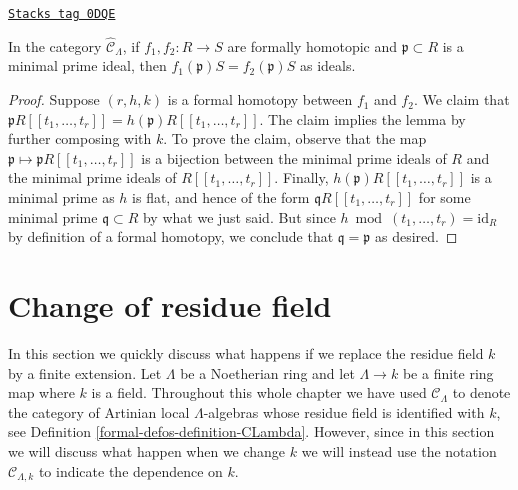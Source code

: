 \begin{lemma}
\label{formal-defos-lemma-homotopic-minimal-prime}
\href{https://stacks.math.columbia.edu/tag/0DQE}{\texttt{Stacks tag 0DQE}}

In the category $\widehat{\mathcal{C}}_\Lambda$, if $f_1, f_2 : R \to S$
are formally homotopic and $\mathfrak p \subset R$ is a minimal
prime ideal, then $f_1(\mathfrak p)S = f_2(\mathfrak p)S$ as ideals.
\end{lemma}

\begin{proof}
Suppose $(r, h, k)$ is a formal homotopy between $f_1$ and $f_2$.
We claim that
$\mathfrak pR[[t_1, \ldots, t_r]] = h(\mathfrak p)R[[t_1, \ldots, t_r]]$.
The claim implies the lemma by further composing with $k$.
To prove the claim, observe that the map
$\mathfrak p \mapsto \mathfrak pR[[t_1, \ldots, t_r]]$
is a bijection between the minimal prime ideals of $R$ and the
minimal prime ideals of $R[[t_1, \ldots, t_r]]$.
Finally, $h(\mathfrak p)R[[t_1, \ldots, t_r]]$ is a minimal
prime as $h$ is flat, and hence of the form
$\mathfrak q R[[t_1, \ldots, t_r]]$ for some minimal
prime $\mathfrak q \subset R$ by what we just said.
But since $h \bmod (t_1, \ldots, t_r) = \text{id}_R$ by
definition of a formal homotopy, we conclude that
$\mathfrak q = \mathfrak p$ as desired.
\end{proof}

\section{Change of residue field}
\label{formal-defos-section-change-of-field}
In this section we quickly discuss what happens if we replace the residue
field $k$ by a finite extension. Let $\Lambda$ be a Noetherian ring and
let $\Lambda \to k$ be a finite ring map where $k$ is a field. Throughout
this whole chapter we have used $\mathcal{C}_\Lambda$ to denote the
category of Artinian local $\Lambda$-algebras whose residue field is
identified with $k$, see Definition \ref{formal-defos-definition-CLambda}.
However, since in this section we will discuss what happen when we change
$k$ we will instead use the notation $\mathcal{C}_{\Lambda, k}$ to
indicate the dependence on $k$.

